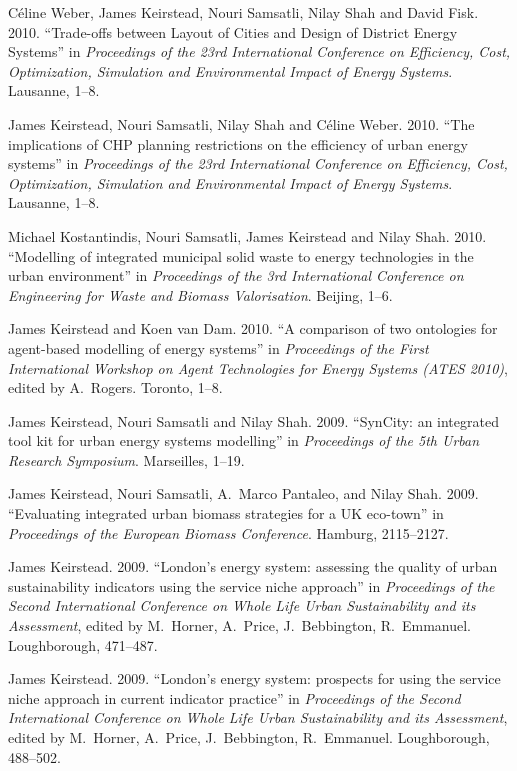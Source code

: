 \documentclass[11pt,a4paper]{article}
\begin{document}
\ind C\'{e}line Weber, James Keirstead, Nouri Samsatli, Nilay Shah and David Fisk. 2010. ``Trade-offs between Layout of Cities and Design of District Energy Systems'' in \emph{Proceedings of the 23rd International Conference on Efficiency, Cost, Optimization, Simulation and Environmental Impact of Energy Systems}.  Lausanne, 1--8.

\ind James Keirstead, Nouri Samsatli, Nilay Shah and C\'{e}line Weber. 2010. ``The implications of CHP planning restrictions on the efficiency of urban energy systems'' in \emph{Proceedings of the 23rd International Conference on Efficiency, Cost, Optimization, Simulation and Environmental Impact of Energy Systems}.  Lausanne, 1--8.

\ind Michael Kostantindis, Nouri Samsatli, James Keirstead and Nilay Shah. 2010. ``Modelling of integrated municipal solid waste to energy technologies in the urban environment'' in \emph{Proceedings of the 3rd International Conference on Engineering for Waste and Biomass Valorisation}.  Beijing, 1--6.

\ind James Keirstead and Koen van Dam. 2010. ``A comparison of two ontologies for agent-based modelling of energy systems'' in \emph{Proceedings of the First International Workshop on Agent Technologies for Energy Systems (ATES 2010)}, edited by A.\ Rogers. Toronto, 1--8. 

\ind James Keirstead, Nouri Samsatli and Nilay Shah. 2009. ``SynCity: an integrated tool kit for urban energy systems modelling'' in \emph{Proceedings of the 5th Urban Research Symposium}.  Marseilles, 1--19.

\ind James Keirstead, Nouri Samsatli, A.\ Marco Pantaleo, and Nilay Shah. 2009. ``Evaluating integrated urban biomass strategies for a UK eco-town'' in \emph{Proceedings of the European Biomass Conference}.  Hamburg, 2115--2127.

\ind James Keirstead. 2009. ``London's energy system: assessing the quality of urban sustainability indicators using the service niche approach'' in \emph{Proceedings of the Second International Conference on Whole Life Urban Sustainability and its Assessment}, edited by M.\ Horner, A.\ Price, J.\ Bebbington, R.\ Emmanuel.  Loughborough, 471--487.

\ind James Keirstead. 2009. ``London's energy system: prospects for using the service niche approach in current indicator practice'' in \emph{Proceedings of the Second International Conference on Whole Life Urban Sustainability and its Assessment}, edited by M.\ Horner, A.\ Price, J.\ Bebbington, R.\ Emmanuel.  Loughborough, 488--502.
\end{document}

